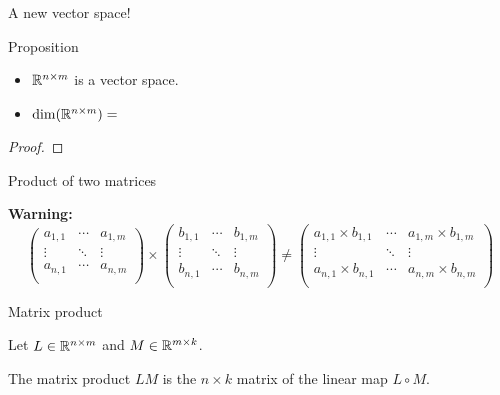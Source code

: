 \documentclass{beamer}
\begin{document}
\begin{frame}[t]{A new vector space!}
	\vspace{-0.3cm}
	\begin{block}{Proposition}
		\begin{itemize}
			\item $\mathbb{R}^{n \times m}$ is a vector space. 
			\item ${{\rm dim}}(\mathbb{R}^{n \times m}) = $
		\end{itemize}
	\end{block}
	\begin{proof}
		\vspace{4cm}
		\vfill
	\end{proof}
\end{frame}
\begin{frame}[t]{Product of two matrices}
	\grid

	\textbf{Warning:}
	{\small
		$$
		\!\!\!\!\!\!\!\!\!\!\!\!
		\begin{pmatrix}
			a_{1,1}  & \cdots & a_{1,m} \\
			\vdots & \ddots & \vdots \\
			a_{n,1} & \cdots & a_{n,m} \\
		\end{pmatrix}
		\times
		\begin{pmatrix}
			b_{1,1}  & \cdots & b_{1,m} \\
			\vdots & \ddots & \vdots \\
			b_{n,1} & \cdots & b_{n,m} \\
		\end{pmatrix}
		\neq
		\begin{pmatrix}
			a_{1,1} \times b_{1,1}  & \cdots & a_{1,m} \times b_{1,m} \\
			\vdots & \ddots & \vdots \\
			a_{n,1} \times b_{n,1} & \cdots & a_{n,m} \times b_{n,m} \\
		\end{pmatrix}
		$$
	}
\end{frame}

\begin{frame}[t]{Matrix product}
	\grid

	Let $L \in \mathbb{R}^{n \times m}$ and $M \in \mathbb{R}^{m \times k}$. 
	\begin{definition}
		The matrix product $LM$ is the $n \times k$ matrix of the linear map $L \circ M$.
	\end{definition}
	\vspace{2.7cm}
\end{frame}
\end{document}
